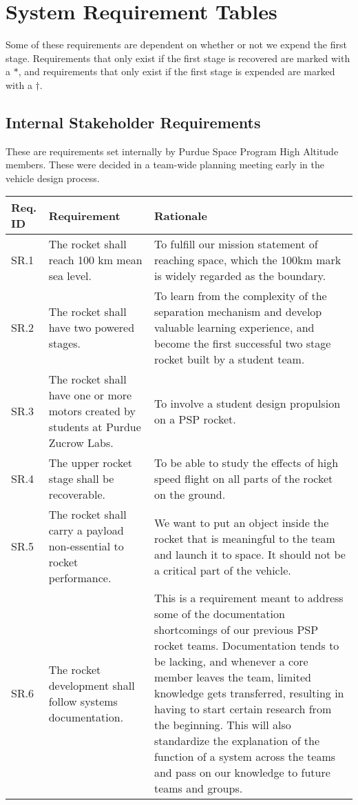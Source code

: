\section{System Requirement Tables} \label{section:system-appendix}
Some of these requirements are dependent on whether or not we expend the first stage. Requirements that only exist if the first stage is recovered are marked with a \(*\), and requirements that only exist if the first stage is expended are marked with a \(\dagger\).

\subsection{Internal Stakeholder Requirements}
These are requirements set internally by Purdue Space Program High Altitude members. These were decided in a team-wide planning meeting early in the vehicle design process.

\begin{table}[htbp]
    \centering
    \footnotesize 
    \setlength{\tymin}{40pt}
    \let\raggedright\RaggedRight
    
    \begin{tabulary}{\textwidth}{@{}LLL@{}}
    \toprule
        \textbf{Req. ID} & \textbf{Requirement} & \textbf{Rationale} \\
    \midrule
        SR.1 & The rocket shall reach 100 km mean sea level. & To fulfill our mission statement of reaching space, which the 100km mark is widely regarded as the boundary. \\ 
        SR.2 & The rocket shall have two powered stages. & To learn from the complexity of the separation mechanism and develop valuable learning experience, and become the first successful two stage rocket built by a student team. \\ 
        SR.3 & The rocket shall have one or more motors created by students at Purdue Zucrow Labs. & To involve a student design propulsion on a PSP rocket. \\
        SR.4 & The upper rocket stage shall be recoverable. & To be able to study the effects of high speed flight on all parts of the rocket on the ground. \\
        SR.5 & The rocket shall carry a payload non-essential to rocket performance. & We want to put an object inside the rocket that is meaningful to the team and launch it to space. It should not be a critical part of the vehicle. \\
        SR.6 & The rocket development shall follow systems documentation. & This is a requirement meant to address some of the documentation shortcomings of our previous PSP rocket teams. Documentation tends to be lacking, and whenever a core member leaves the team, limited knowledge gets transferred, resulting in having to start certain research from the beginning. This will also standardize the explanation of the function of a system across the teams and pass on our knowledge to future teams and groups. \\
    \bottomrule
    \end{tabulary}

    \label{table:internal-stakeholder}
\end{table}



